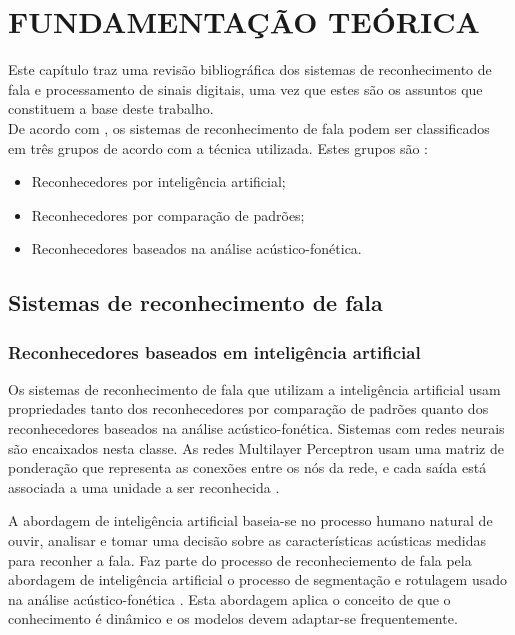 \chapter{FUNDAMENTAÇÃO TEÓRICA}
\label{chap:referencial_teorico}
\thispagestyle{plain}
Este capítulo traz uma revisão bibliográfica dos sistemas de reconhecimento de fala e processamento de sinais digitais, uma vez que estes são os assuntos que constituem a base deste trabalho.\\

De acordo com \cite{fundRecFala}, os  sistemas de reconhecimento de fala podem ser classificados em três grupos de acordo com a técnica utilizada. Estes grupos são :
\begin{itemize}
\item Reconhecedores por inteligência artificial;
\item Reconhecedores por comparação de padrões;
\item Reconhecedores baseados na análise acústico-fonética.
\end{itemize}
\section{Sistemas de reconhecimento de fala }

\label{sec:sistemasdereconhecimentodefala}


\subsection{Reconhecedores baseados em inteligência artificial}

Os sistemas de reconhecimento de fala que utilizam a inteligência artificial usam propriedades tanto dos reconhecedores por comparação de padrões quanto dos reconhecedores baseados na análise acústico-fonética. Sistemas com redes neurais são encaixados nesta classe. As redes Multilayer Perceptron usam uma matriz de ponderação que representa as conexões entre os nós da rede, e cada saída está associada a uma unidade a ser reconhecida \cite{kluwerNeural}.

A abordagem de inteligência artificial  baseia-se no processo humano natural de ouvir, analisar e tomar uma decisão sobre as características acústicas medidas para reconher a fala. Faz parte do processo de reconheciemento de fala pela abordagem de inteligência artificial o processo de segmentação e rotulagem usado na análise acústico-fonética  \cite{fundRecFala}. Esta abordagem aplica o conceito de que o conhecimento é dinâmico  e os modelos devem adaptar-se frequentemente. 

